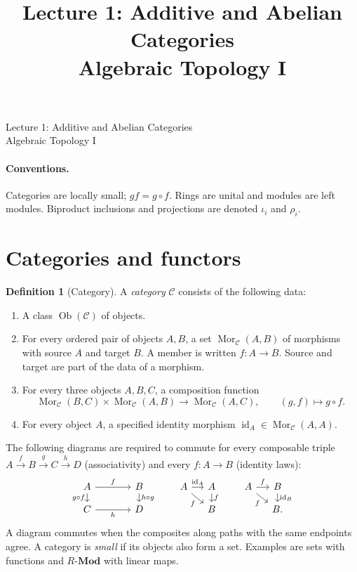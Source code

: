 \documentclass[11pt]{article}
\title{Lecture 1: Additive and Abelian Categories\\[0.5ex]\large Algebraic Topology I}
\author{}
\date{}
\theoremstyle{definition}
\newtheorem{definition}{Definition}[section]
\theoremstyle{plain}
\newcommand{\C}{\mathcal C}
\newcommand{\Mor}{\operatorname{Mor}}
\newcommand{\Ob}{\operatorname{Ob}}
\newcommand{\id}{\operatorname{id}}
\newcommand{\Mod}{\mathbf{Mod}}
\begin{document}
\begin{center}
{\Large Lecture 1: Additive and Abelian Categories}\\[4pt]
Algebraic Topology I
\end{center}
\paragraph{Conventions.} Categories are locally small; $gf=g\circ f$. Rings are unital and modules are left modules. Biproduct inclusions and projections are denoted $\iota_i$ and $\rho_i$.

\section{Categories and functors}
\begin{definition}[Category]
A \emph{category} $\C$ consists of the following data:
\begin{enumerate}
\item A class $\Ob(\C)$ of objects.
\item For every ordered pair of objects $A,B$, a set $\Mor_{\C}(A,B)$ of morphisms with source $A$ and target $B$. A member is written $f\colon A\to B$. Source and target are part of the data of a morphism.
\item For every three objects $A,B,C$, a composition function
\[
\Mor_{\C}(B,C)\times\Mor_{\C}(A,B)\longrightarrow\Mor_{\C}(A,C),
\qquad (g,f)\longmapsto g\circ f.
\]
\item For every object $A$, a specified identity morphism $\id_A\in\Mor_{\C}(A,A)$.
\end{enumerate}
The following diagrams are required to commute for every composable triple
$A\xrightarrow{f}B\xrightarrow{g}C\xrightarrow{h}D$ (associativity)
and every $f\colon A\to B$ (identity laws):
\[
\begin{tikzcd}[column sep=large,row sep=small]
A\arrow[r,"f"]\arrow[d,"g\circ f"']&B\arrow[d,"h\circ g"]\\
C\arrow[r,"h"']&D
\end{tikzcd}
\qquad
\begin{tikzcd}[column sep=small,row sep=small]
A\arrow[r,"\id_A"]\arrow[dr,"f"']&A\arrow[d,"f"]\\
&B
\end{tikzcd}
\qquad
\begin{tikzcd}[column sep=small,row sep=small]
A\arrow[r,"f"]\arrow[dr,"f"']&B\arrow[d,"\id_B"]\\
&B.
\end{tikzcd}
\]
A diagram commutes when the composites along paths with the same endpoints agree.
A category is \emph{small} if its objects also form a set. Examples are sets with functions and $R\text{-}\Mod$ with linear maps.
\end{definition}
\end{document}
